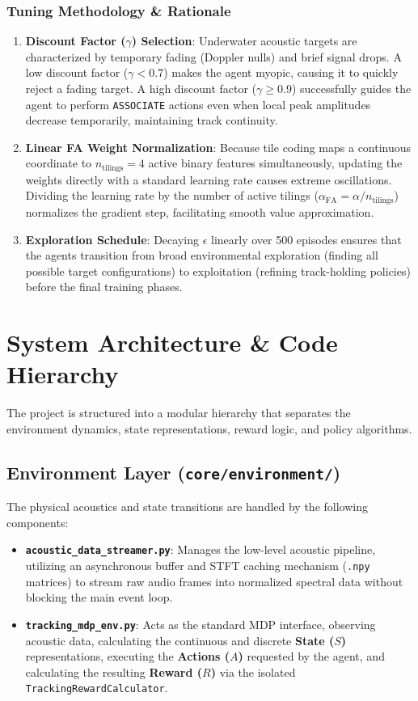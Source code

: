 \documentclass[12pt,a4paper]{article}
\begin{document}
\subsubsection{Tuning Methodology \& Rationale}
\begin{enumerate}
    \item \textbf{Discount Factor ($\gamma$) Selection}: Underwater acoustic targets are characterized by temporary fading (Doppler nulls) and brief signal drops. A low discount factor ($\gamma < 0.7$) makes the agent myopic, causing it to quickly reject a fading target. A high discount factor ($\gamma \ge 0.9$) successfully guides the agent to perform \texttt{ASSOCIATE} actions even when local peak amplitudes decrease temporarily, maintaining track continuity.
    \item \textbf{Linear FA Weight Normalization}: Because tile coding maps a continuous coordinate to $n_{\text{tilings}} = 4$ active binary features simultaneously, updating the weights directly with a standard learning rate causes extreme oscillations. Dividing the learning rate by the number of active tilings ($\alpha_{\text{FA}} = \alpha / n_{\text{tilings}}$) normalizes the gradient step, facilitating smooth value approximation.
    \item \textbf{Exploration Schedule}: Decaying $\epsilon$ linearly over 500 episodes ensures that the agents transition from broad environmental exploration (finding all possible target configurations) to exploitation (refining track-holding policies) before the final training phases.
\end{enumerate}

\section{System Architecture \& Code Hierarchy}
The project is structured into a modular hierarchy that separates the environment dynamics, state representations, reward logic, and policy algorithms.

\subsection{Environment Layer (\texttt{core/environment/})}
The physical acoustics and state transitions are handled by the following components:
\begin{itemize}
    \item \textbf{\texttt{acoustic\_data\_streamer.py}}: Manages the low-level acoustic pipeline, utilizing an asynchronous buffer and STFT caching mechanism (\texttt{.npy} matrices) to stream raw audio frames into normalized spectral data without blocking the main event loop.
    \item \textbf{\texttt{tracking\_mdp\_env.py}}: Acts as the standard MDP interface, observing acoustic data, calculating the continuous and discrete \textbf{State ($S$)} representations, executing the \textbf{Actions ($A$)} requested by the agent, and calculating the resulting \textbf{Reward ($R$)} via the isolated \texttt{TrackingRewardCalculator}.
\end{itemize}
\end{document}
